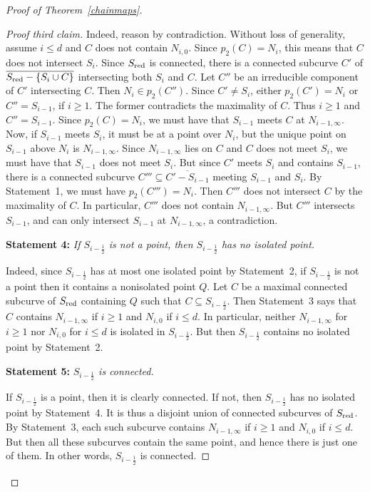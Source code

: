 \documentclass[a4paper,11pt]{amsart}
\theoremstyle{plain}
\theoremstyle{definition}
\theoremstyle{remark}
\def\red{\text{\rm red}}
\begin{document}
\begin{proof}[Proof of Theorem~\ref{chainmaps}]
\begin{proof}[Proof third claim]
Indeed, reason by contradiction. Without loss of generality, assume $i\leq d$ and $C$ does not contain $N_{i,0}$. Since $p_2(C)=N_i$, this means that $C$ does not intersect $S_i$. Since $S_\red$ is connected, there is a connected subcurve $C'$ of $\overline{S_\red-\{S_i\cup C\}}$ intersecting both $S_i$ and $C$. Let $C''$ be an irreducible component of $C'$ intersecting $C$. Then $N_i\in p_2(C'')$. Since $C'\neq S_i$, either $p_2(C' )=N_i$ or $C''=S_{i-1}$, if $i\geq 1$. The former contradicts the maximality of $C$. Thus $i\geq 1$ and $C''=S_{i-1}$. Since $p_2(C)=N_i$, we must have that $S_{i-1}$ meets $C$ at $N_{i-1,\infty}$. Now, if $S_{i-1}$  meets $S_i$, it must be at a point over $N_i$, but the unique point on $S_{i-1}$ above $N_i$ is $N_{i-1,\infty}$. Since $N_{i-1,\infty}$ lies on $C$ and $C$ does not meet $S_i$, we must have that $S_{i-1}$ does not meet $S_i$. But since $C'$ meets $S_i$ and contains $S_{i-1}$, there is a connected subcurve $C'''\subseteq\overline{C'-S_{i-1}}$ meeting $S_{i-1}$ and $S_i$. By Statement~1, we must have $p_2(C''')=N_i$. Then $C'''$ does not intersect $C$ by the maximality of $C$. In particular, $C'''$ does not contain $N_{i-1,\infty}$. But $C'''$ intersects $S_{i-1}$, and can only intersect $S_{i-1}$ at $N_{i-1,\infty}$, a contradiction.

\vskip0.1cm

{\bf Statement 4:} {\it If $S_{i-\frac{1}{2}}$ is not a point, then 
$S_{i-\frac{1}{2}}$ has no isolated point.} 

Indeed, since $S_{i-\frac{1}{2}}$ has at most one isolated point by Statement~2, if $S_{i-\frac{1}{2}}$ is not a point then it contains a nonisolated point $Q$. Let $C$ be a maximal connected subcurve of $S_\red$ containing $Q$ such that $C\subseteq S_{i-\frac{1}{2}}$. Then Statement~3 says that $C$ contains $N_{i-1,\infty}$ if $i\geq 1$ and $N_{i,0}$ if $i\leq d$. In particular, neither $N_{i-1,\infty}$ for $i\geq 1$ nor $N_{i,0}$ for $i\leq d$ is isolated in $S_{i-\frac{1}{2}}$. But then $S_{i-\frac{1}{2}}$ contains no isolated point by Statement~2.

\vskip0.1cm

{\bf Statement 5:} {\it $S_{i-\frac{1}{2}}$ is connected.}

If $S_{i-\frac{1}{2}}$ is a point, then it is clearly connected. If not, then $S_{i-\frac{1}{2}}$ has no isolated point by Statement~4. It is thus a disjoint union of connected subcurves of $S_\red$. By Statement~3, each such subcurve contains $N_{i-1,\infty}$ if $i\geq 1$ and $N_{i,0}$ if $i\leq d$. But then all these subcurves contain the same point, and hence there is just one of them. In other words, $S_{i-\frac{1}{2}}$ is connected.
\end{proof}


\end{proof}
\end{document}
